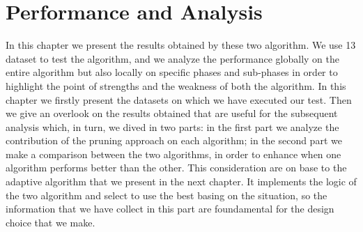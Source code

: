 \section{Performance and Analysis}
In this chapter we present the results obtained by these two algorithm. We use 13 dataset to test the algorithm, and we analyze the performance globally on the entire algorithm but also locally on specific phases and sub-phases in order to highlight the point of strengths and the weakness of both the algorithm. In this chapter we firstly present the datasets on which we have executed our test. Then we give an overlook on the results obtained that are useful for the subsequent analysis which, in turn, we dived in two parts: in the first part we analyze the contribution of the pruning approach on each algorithm; in the second part we make a comparison between the two algorithms, in order to enhance when one algorithm performs better than the other. This consideration are on base to the adaptive algorithm that we present in the next chapter. It implements the logic of the two algorithm and select to use the best basing on the situation, so the information that we have collect in this part are foundamental for the design choice that we make. 
